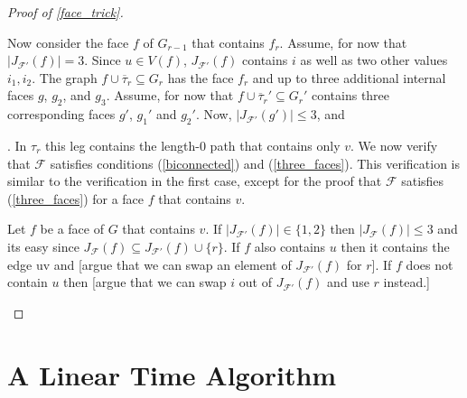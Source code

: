 \documentclass{patmorin}
\begin{document}
\begin{proof}[Proof of \cref{face_trick}]
\begin{enumerate}
    Now consider the face $f$ of $G_{r-1}$ that contains $f_r$.  Assume, for now that $|J_{\mathcal{F'}}(f)|=3$.  Since $u\in V(f)$, $J_{\mathcal{F'}}(f)$ contains $i$ as well as two other values $i_1,i_2$.  The graph $f\cup\overline{\tau}_r\subseteq G_r$ has the face $f_r$ and up to three additional internal faces $g$, $g_2$, and $g_3$.  Assume, for now that $f\cup\overline{\tau}_r'\subseteq G_r'$ contains three corresponding faces $g'$, $g_1'$ and $g_2'$.  Now, $|J_{\mathcal{F'}}(g')|\le 3$, and 
    
    
    
    
    
    
    .  In $\tau_r$ this leg contains the length-$0$ path that contains only $v$.  We now verify that $\mathcal{F}$ satisfies conditions (\ref{biconnected}) and (\ref{three_faces}).  This verification is similar to the verification in the first case, except for the proof that $\mathcal{F}$ satisfies (\ref{three_faces}) for a face $f$ that contains $v$.

    Let $f$ be a face of $G$ that contains $v$.  If $|J_{\mathcal{F}'}(f)|\in\{1,2\}$ then $|J_{\mathcal{F}}(f)|\le 3$ and its easy since $J_{\mathcal{F}}(f)\subseteq J_{\mathcal{F'}}(f)\cup\{r\}$.  If $f$ also contains $u$ then it contains the edge uv and [argue that we can swap an element of $J_{\mathcal{F}'}(f)$ for $r$].  If $f$ does not contain $u$ then [argue that we can swap $i$ out of $J_{\mathcal{F}'}(f)$ and use $r$ instead.]  \qedhere
  \end{enumerate}
\end{proof}


\section{A Linear Time Algorithm}




\end{document}
